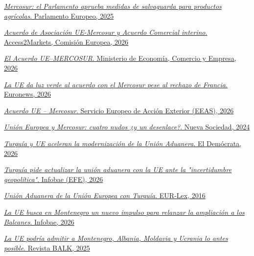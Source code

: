 \documentclass[10pt,a4paper]{article}
\begin{document}
\href{https://www.europarl.europa.eu/news/es/press-room/20251211IPR32162/mercosur-el-parlamento-aprueba-medidas-de-salvaguarda-para-productos-agricolas}{\textit{Mercosur: el Parlamento aprueba medidas de salvaguarda para productos agrícolas}. Parlamento Europeo, 2025}

\href{https://trade.ec.europa.eu/access-to-markets/es/content/acuerdo-de-asociacion-ue-mercosur-y-acuerdo-comercial-interino}{\textit{Acuerdo de Asociación UE-Mercosur y Acuerdo Comercial interino}. Access2Markets, Comisión Europea, 2026}

\href{https://comercio.gob.es/PoliticaComercialUE/AcuerdosComerciales/Paginas/Mercosur.aspx}{\textit{El Acuerdo UE–MERCOSUR}. Ministerio de Economía, Comercio y Empresa, 2026}

\href{https://es.euronews.com/my-europe/2026/01/09/la-ue-da-luz-verde-al-acuerdo-con-el-mercosur-pese-al-rechazo-de-francia}{\textit{La UE da luz verde al acuerdo con el Mercosur pese al rechazo de Francia}. Euronews, 2026}

\href{https://www.eeas.europa.eu/delegations/argentina/acuerdo-ue-%E2%80%93-mercosur_und_en}{\textit{Acuerdo UE – Mercosur}. Servicio Europeo de Acción Exterior (EEAS), 2026}

\href{https://nuso.org/articulo/311-UE-y-mercosur-cuatro-nudos-un-desenlace/}{\textit{Unión Europea y Mercosur: cuatro nudos ¿y un desenlace?}. Nueva Sociedad, 2024}

\href{https://www.democrata.es/internacional/turquia-y-la-ue-dan-pasos-para-modernizar-la-union-aduanera-y-que-alcance-todo-su-potencial/}{\textit{Turquía y UE aceleran la modernización de la Unión Aduanera}. El Demócrata, 2026}

\href{https://www.infobae.com/america/agencias/2026/02/06/turquia-pide-actualizar-la-union-aduanera-con-la-ue-ante-la-incertidumbre-geopolitica/}{\textit{Turquía pide actualizar la unión aduanera con la UE ante la "incertidumbre geopolítica"}. Infobae (EFE), 2026}

\href{https://eur-lex.europa.eu/ES/legal-content/summary/eu-customs-union-with-turkey.html}{\textit{Unión Aduanera de la Unión Europea con Turquía}. EUR-Lex, 2016}

\href{https://www.infobae.com/america/agencias/2026/06/05/la-ue-busca-en-montenegro-un-nuevo-impulso-para-relanzar-la-ampliacion-a-los-balcanes/}{\textit{La UE busca en Montenegro un nuevo impulso para relanzar la ampliación a los Balcanes}. Infobae, 2026}

\href{https://balk.hu/es/2025/12/05/montenegro-albania-moldova-ukrajna-eu-bovites/}{\textit{La UE podría admitir a Montenegro, Albania, Moldavia y Ucrania lo antes posible}. Revista BALK, 2025}
\end{document}
